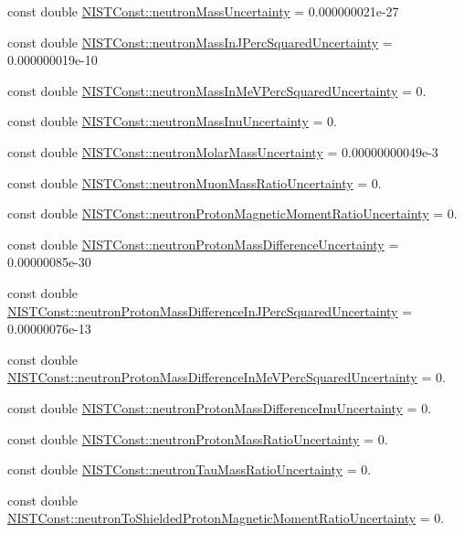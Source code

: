 \begin{DoxyCompactItemize}
\item 
const double \hyperlink{group___n_i_s_t_const-_neutron_gacce8fdd0e4017cd74864a675cd18ca82}{N\+I\+S\+T\+Const\+::neutron\+Mass\+Uncertainty} = 0.\+000000021e-\/27
\item 
const double \hyperlink{group___n_i_s_t_const-_neutron_ga57aaa28bbca122689e5a0541663225c7}{N\+I\+S\+T\+Const\+::neutron\+Mass\+In\+J\+Perc\+Squared\+Uncertainty} = 0.\+000000019e-\/10
\item 
const double \hyperlink{group___n_i_s_t_const-_neutron_gabad9960163d1a927a926784d170822e1}{N\+I\+S\+T\+Const\+::neutron\+Mass\+In\+Me\+V\+Perc\+Squared\+Uncertainty} = 0.
\item 
const double \hyperlink{group___n_i_s_t_const-_neutron_ga660ae4587a0399c1f58f3ba6142c4b9e}{N\+I\+S\+T\+Const\+::neutron\+Mass\+Inu\+Uncertainty} = 0.
\item 
const double \hyperlink{group___n_i_s_t_const-_neutron_ga1b4a0903f80697bbb3343767351da3ab}{N\+I\+S\+T\+Const\+::neutron\+Molar\+Mass\+Uncertainty} = 0.\+00000000049e-\/3
\item 
const double \hyperlink{group___n_i_s_t_const-_neutron_ga54f9049bce28d81a3ad2420dc2bb407d}{N\+I\+S\+T\+Const\+::neutron\+Muon\+Mass\+Ratio\+Uncertainty} = 0.
\item 
const double \hyperlink{group___n_i_s_t_const-_neutron_ga4a027a1c846b998039d3448b72421caf}{N\+I\+S\+T\+Const\+::neutron\+Proton\+Magnetic\+Moment\+Ratio\+Uncertainty} = 0.
\item 
const double \hyperlink{group___n_i_s_t_const-_neutron_gaa120a63bbe7a62d24c2e7ccab3e889d1}{N\+I\+S\+T\+Const\+::neutron\+Proton\+Mass\+Difference\+Uncertainty} = 0.\+00000085e-\/30
\item 
const double \hyperlink{group___n_i_s_t_const-_neutron_gaee1fb077bb946b8bd7df60ac2bc6e7e7}{N\+I\+S\+T\+Const\+::neutron\+Proton\+Mass\+Difference\+In\+J\+Perc\+Squared\+Uncertainty} = 0.\+00000076e-\/13
\item 
const double \hyperlink{group___n_i_s_t_const-_neutron_ga57857edd0ec92aa1ed06edc688aecad9}{N\+I\+S\+T\+Const\+::neutron\+Proton\+Mass\+Difference\+In\+Me\+V\+Perc\+Squared\+Uncertainty} = 0.
\item 
const double \hyperlink{group___n_i_s_t_const-_neutron_gad3c6909951abc224df3af9739f3ed08e}{N\+I\+S\+T\+Const\+::neutron\+Proton\+Mass\+Difference\+Inu\+Uncertainty} = 0.
\item 
const double \hyperlink{group___n_i_s_t_const-_neutron_ga74cca90bc106fb1c82ebb51ceb2036f2}{N\+I\+S\+T\+Const\+::neutron\+Proton\+Mass\+Ratio\+Uncertainty} = 0.
\item 
const double \hyperlink{group___n_i_s_t_const-_neutron_gac328a3ee0b34cc5009c70ffc28d666fb}{N\+I\+S\+T\+Const\+::neutron\+Tau\+Mass\+Ratio\+Uncertainty} = 0.
\item 
const double \hyperlink{group___n_i_s_t_const-_neutron_gaff82970ee04703c04a57ec28950bbd18}{N\+I\+S\+T\+Const\+::neutron\+To\+Shielded\+Proton\+Magnetic\+Moment\+Ratio\+Uncertainty} = 0.
\end{DoxyCompactItemize}


